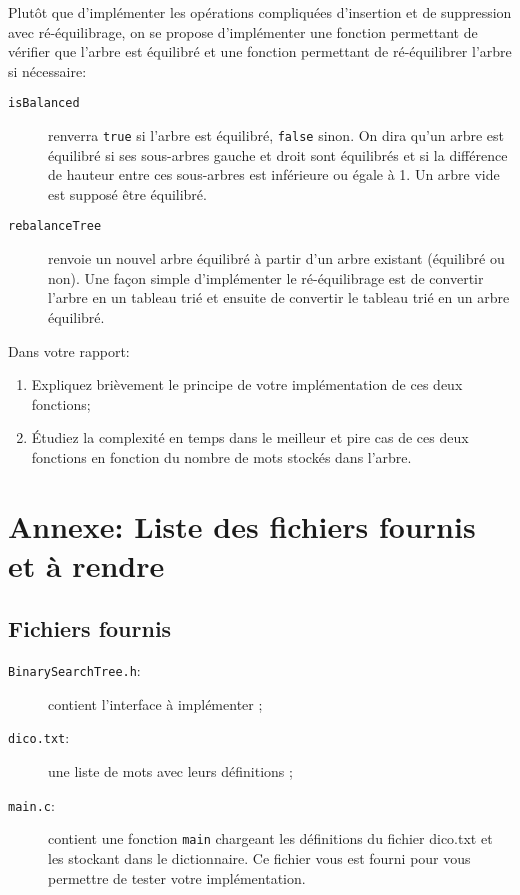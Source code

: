 \documentclass[a4paper,10pt]{article}
\begin{document}
Plutôt que d'implémenter les opérations compliquées d'insertion et de
suppression avec ré-équilibrage, on se propose d'implémenter une
fonction permettant de vérifier que l'arbre est équilibré et une
fonction permettant de ré-équilibrer l'arbre si nécessaire:
\begin{description}
\item[\texttt{isBalanced}] renverra \texttt{true} si l'arbre est équilibré, \texttt{false}
  sinon. On dira qu'un arbre est équilibré si ses sous-arbres gauche
  et droit sont équilibrés et si la différence de hauteur entre ces
  sous-arbres est inférieure ou égale à 1. Un arbre vide est supposé
  être équilibré.
\item[\texttt{rebalanceTree}] renvoie un nouvel arbre équilibré à
  partir d'un arbre existant (équilibré ou non). Une façon simple
  d'implémenter le ré-équilibrage est de convertir l'arbre en un
  tableau trié et ensuite de convertir le tableau trié en un arbre
  équilibré.
\end{description}

Dans votre rapport:
\begin{enumerate}
\item Expliquez brièvement le principe de votre implémentation de ces deux fonctions;
\item \'Etudiez la complexité en temps dans le meilleur et pire cas de
  ces deux fonctions en fonction du nombre de mots stockés dans
  l'arbre.
\end{enumerate}

\section*{Annexe: Liste des fichiers fournis et à rendre}

\subsection*{Fichiers fournis}
\begin{description}
\item[\texttt{BinarySearchTree.h}:] contient l'interface à implémenter ;
\item[\texttt{dico.txt}:] une liste de mots avec leurs définitions ;
\item[\texttt{main.c}:] contient une fonction \texttt{main} chargeant les définitions du fichier dico.txt et les stockant dans le dictionnaire. Ce fichier vous est fourni pour vous permettre de tester votre implémentation.
\end{description}
\end{document}
